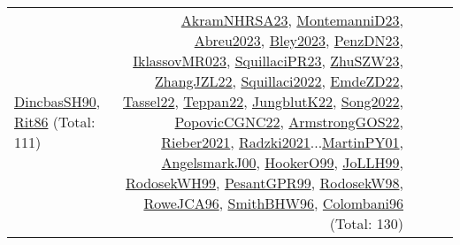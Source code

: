 {\begin{longtable}{p{3cm}r>{\raggedright\arraybackslash}p{6cm}>{\raggedright\arraybackslash}p{6cm}>{\raggedright\arraybackslash}p{8cm}}
\hyperref[detail:DincbasSH90]{DincbasSH90}, \hyperref[detail:Rit86]{Rit86} (Total: 111) & \hyperref[detail:AkramNHRSA23]{AkramNHRSA23}, \hyperref[detail:MontemanniD23]{MontemanniD23}, \hyperref[detail:Abreu2023]{Abreu2023}, \hyperref[detail:Bley2023]{Bley2023}, \hyperref[detail:PenzDN23]{PenzDN23}, \hyperref[detail:IklassovMR023]{IklassovMR023}, \hyperref[detail:SquillaciPR23]{SquillaciPR23}, \hyperref[detail:ZhuSZW23]{ZhuSZW23}, \hyperref[detail:ZhangJZL22]{ZhangJZL22}, \hyperref[detail:Squillaci2022]{Squillaci2022}, \hyperref[detail:EmdeZD22]{EmdeZD22}, \hyperref[detail:Tassel22]{Tassel22}, \hyperref[detail:Teppan22]{Teppan22}, \hyperref[detail:JungblutK22]{JungblutK22}, \hyperref[detail:Song2022]{Song2022}, \hyperref[detail:PopovicCGNC22]{PopovicCGNC22}, \hyperref[detail:ArmstrongGOS22]{ArmstrongGOS22}, \hyperref[detail:Rieber2021]{Rieber2021}, \hyperref[detail:Radzki2021]{Radzki2021}...\hyperref[detail:MartinPY01]{MartinPY01}, \hyperref[detail:AngelsmarkJ00]{AngelsmarkJ00}, \hyperref[detail:HookerO99]{HookerO99}, \hyperref[detail:JoLLH99]{JoLLH99}, \hyperref[detail:RodosekWH99]{RodosekWH99}, \hyperref[detail:PesantGPR99]{PesantGPR99}, \hyperref[detail:RodosekW98]{RodosekW98}, \hyperref[detail:RoweJCA96]{RoweJCA96}, \hyperref[detail:SmithBHW96]{SmithBHW96}, \hyperref[detail:Colombani96]{Colombani96} (Total: 130)\\

\end{longtable}}
